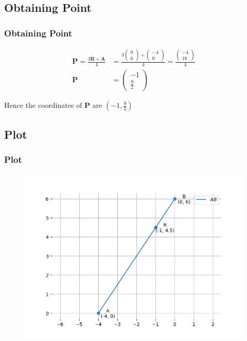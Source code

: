 \documentclass{beamer}
\providecommand{\brak}[1]{\ensuremath{\left(#1\right)}}
\theoremstyle{remark}
\newcommand{\myvec}[1]{\ensuremath{\begin{pmatrix}#1\end{pmatrix}}}
\let\vec\mathbf
\numberwithin{equation}{section}
\begin{document}
\subsection{Obtaining Point}
\begin{frame}
\frametitle{Obtaining Point}

\begin{align}
\vec{P}=\frac{3\vec{B}+\vec{A}}{4}&=\frac{3\myvec{0\\6}+\myvec{-4\\0}}{4}=\frac{\myvec{-4\\18}}{4} \\
\vec{P}
&=\myvec{-1\\\frac{9}{2}}
\end{align}

Hence the coordinates of $\vec{P}$ are $\brak{-1,\frac{9}{2}}$



\end{frame}

\subsection{Plot}
\begin{frame}[fragile]
\frametitle{Plot}

\begin{figure}[h!]
   \centering
   \includegraphics[width=0.9\linewidth]{figs/fig1.png}
	\caption{}
   \label{stemplot}
\end{figure}
\end{frame}
\end{document}
